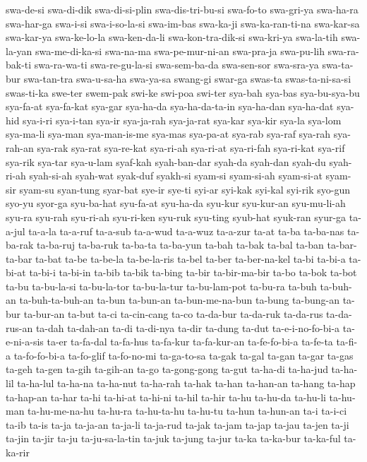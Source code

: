 {swa-de-si swa-di-dik swa-di-si-plin swa-dis-tri-bu-si swa-fo-to swa-gri-ya
swa-ha-ra swa-har-ga swa-i-si swa-i-so-la-si swa-im-bas swa-ka-ji
swa-ka-ran-ti-na swa-kar-sa swa-kar-ya swa-ke-lo-la swa-ken-da-li
swa-kon-tra-dik-si swa-kri-ya swa-la-tih swa-la-yan swa-me-di-ka-si
swa-na-ma swa-pe-mur-ni-an swa-pra-ja swa-pu-lih swa-ra-bak-ti
swa-ra-wa-ti swa-re-gu-la-si swa-sem-ba-da swa-sen-sor swa-sra-ya
swa-ta-bur swa-tan-tra swa-u-sa-ha swa-ya-sa swang-gi swar-ga swas-ta
swas-ta-ni-sa-si swas-ti-ka swe-ter swem-pak swi-ke swi-poa swi-ter
sya-bah sya-bas sya-bu-sya-bu sya-fa-at sya-fa-kat sya-gar sya-ha-da
sya-ha-da-ta-in sya-ha-dan sya-ha-dat sya-hid sya-i-ri sya-i-tan sya-ir
sya-ja-rah sya-ja-rat sya-kar sya-kir sya-la sya-lom sya-ma-li sya-man
sya-man-is-me sya-mas sya-pa-at sya-rab sya-raf sya-rah sya-rah-an sya-rak
sya-rat sya-re-kat sya-ri-ah sya-ri-at sya-ri-fah sya-ri-kat sya-rif
sya-rik sya-tar sya-u-lam syaf-kah syah-ban-dar syah-da syah-dan syah-du
syah-ri-ah syah-si-ah syah-wat syak-duf syakh-si syam-si syam-si-ah
syam-si-at syam-sir syam-su syan-tung syar-bat sye-ir sye-ti syi-ar
syi-kak syi-kal syi-rik syo-gun syo-yu syor-ga syu-ba-hat syu-fa-at
syu-ha-da syu-kur syu-kur-an syu-mu-li-ah syu-ra syu-rah syu-ri-ah
syu-ri-ken syu-ruk syu-ting syub-hat syuk-ran syur-ga ta-a-jul ta-a-la
ta-a-ruf ta-a-sub ta-a-wud ta-a-wuz ta-a-zur ta-at ta-ba ta-ba-nas
ta-ba-rak ta-ba-ruj ta-ba-ruk ta-ba-ta ta-ba-yun ta-bah ta-bak ta-bal
ta-ban ta-bar-ta-bar ta-bat ta-be ta-be-la ta-be-la-ris ta-bel ta-ber
ta-ber-na-kel ta-bi ta-bi-a ta-bi-at ta-bi-i ta-bi-in ta-bib ta-bik
ta-bing ta-bir ta-bir-ma-bir ta-bo ta-bok ta-bot ta-bu ta-bu-la-si
ta-bu-la-tor ta-bu-la-tur ta-bu-lam-pot ta-bu-ra ta-buh ta-buh-an
ta-buh-ta-buh-an ta-bun ta-bun-an ta-bun-me-na-bun ta-bung ta-bung-an
ta-bur ta-bur-an ta-but ta-ci ta-cin-cang ta-co ta-da-bur ta-da-ruk
ta-da-rus ta-da-rus-an ta-dah ta-dah-an ta-di ta-di-nya ta-dir ta-dung
ta-dut ta-e-i-no-fo-bi-a ta-e-ni-a-sis ta-er ta-fa-dal ta-fa-hus ta-fa-kur
ta-fa-kur-an ta-fe-fo-bi-a ta-fe-ta ta-fi-a ta-fo-fo-bi-a ta-fo-glif
ta-fo-no-mi ta-ga-to-sa ta-gak ta-gal ta-gan ta-gar ta-gas ta-geh ta-gen
ta-gih ta-gih-an ta-go ta-gong-gong ta-gut ta-ha-di ta-ha-jud ta-ha-lil
ta-ha-lul ta-ha-na ta-ha-nut ta-ha-rah ta-hak ta-han ta-han-an ta-hang
ta-hap ta-hap-an ta-har ta-hi ta-hi-at ta-hi-ni ta-hil ta-hir ta-hu
ta-hu-da ta-hu-li ta-hu-man ta-hu-me-na-hu ta-hu-ra ta-hu-ta-hu ta-hu-tu
ta-hun ta-hun-an ta-i ta-i-ci ta-ib ta-is ta-ja ta-ja-an ta-ja-li
ta-ja-rud ta-jak ta-jam ta-jap ta-jau ta-jen ta-ji ta-jin ta-jir ta-ju
ta-ju-sa-la-tin ta-juk ta-jung ta-jur ta-ka ta-ka-bur ta-ka-ful ta-ka-rir
}
